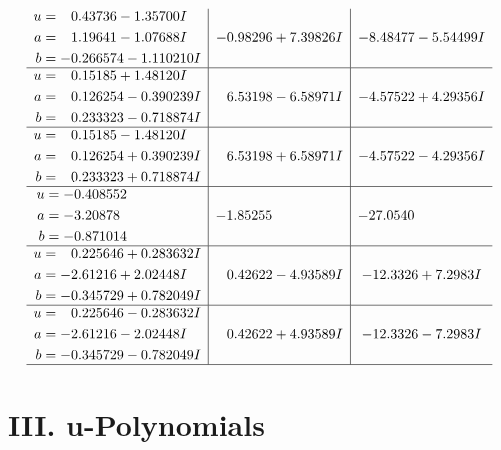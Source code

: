 \documentclass[1p]{elsarticle_modified}
\theoremstyle{definition}
\begin{document}
$$\begin{array}{c|c|c}
\begin{aligned}
u &= \phantom{-}0.43736 - 1.35700 I \\
a &= \phantom{-}1.19641 - 1.07688 I \\
b &= -0.266574 - 1.110210 I\end{aligned}
 & -0.98296 + 7.39826 I & -8.48477 - 5.54499 I \\ \hline\begin{aligned}
u &= \phantom{-}0.15185 + 1.48120 I \\
a &= \phantom{-}0.126254 - 0.390239 I \\
b &= \phantom{-}0.233323 - 0.718874 I\end{aligned}
 & \phantom{-}6.53198 - 6.58971 I & -4.57522 + 4.29356 I \\ \hline\begin{aligned}
u &= \phantom{-}0.15185 - 1.48120 I \\
a &= \phantom{-}0.126254 + 0.390239 I \\
b &= \phantom{-}0.233323 + 0.718874 I\end{aligned}
 & \phantom{-}6.53198 + 6.58971 I & -4.57522 - 4.29356 I \\ \hline\begin{aligned}
u &= -0.408552\phantom{ +0.000000I} \\
a &= -3.20878\phantom{ +0.000000I} \\
b &= -0.871014\phantom{ +0.000000I}\end{aligned}
 & -1.85255\phantom{ +0.000000I} & -27.0540\phantom{ +0.000000I} \\ \hline\begin{aligned}
u &= \phantom{-}0.225646 + 0.283632 I \\
a &= -2.61216 + 2.02448 I \\
b &= -0.345729 + 0.782049 I\end{aligned}
 & \phantom{-}0.42622 - 4.93589 I & -12.3326 + 7.2983 I \\ \hline\begin{aligned}
u &= \phantom{-}0.225646 - 0.283632 I \\
a &= -2.61216 - 2.02448 I \\
b &= -0.345729 - 0.782049 I\end{aligned}
 & \phantom{-}0.42622 + 4.93589 I & -12.3326 - 7.2983 I\\
 \hline 
 \end{array}$$\newpage
\newpage\renewcommand{\arraystretch}{1}
\centering \section*{ III. u-Polynomials}
\end{document}
